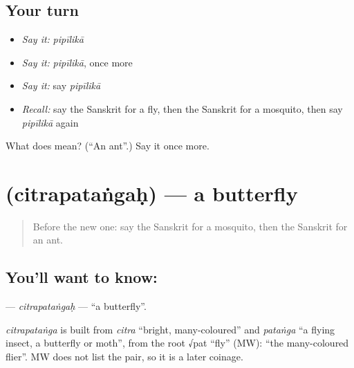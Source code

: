 \subsection*{Your turn}
\begin{itemize}
\raggedright
  \item \emph{Say it:} \emph{pipīlikā}
  \item \emph{Say it:} \emph{pipīlikā}, once more
  \item \emph{Say it:} say \emph{pipīlikā}
  \item \emph{Recall:} say the Sanskrit for a fly, then the Sanskrit for a mosquito, then say \emph{pipīlikā} again
\end{itemize}

\begin{tcolorbox}[breakable,colback=teal!4,colframe=teal!35!black,title={Before you move on}]
What does  mean? (\textquotedblleft{}An ant\textquotedblright{}.) Say it once more.
\end{tcolorbox}
\section[\texorpdfstring{\sk{चित्रपतंगः} (citrapataṅgaḥ)}{चित्रपतंगः (citrapataṅgaḥ)}]{ (citrapataṅgaḥ) — a butterfly}

\label{lesson:SA-C115-citrapatangah}



\begin{quote}
Before the new one: say the Sanskrit for a mosquito, then the Sanskrit for an ant.
\end{quote}

\subsection*{You'll want to know: }
\textbf{} — \emph{citrapataṅgaḥ} — \textquotedblleft{}a butterfly\textquotedblright{}.

\begin{cousinweb}
\emph{citrapataṅga} is built from \emph{citra} \textquotedblleft{}bright, many-coloured\textquotedblright{} and \emph{pataṅga} \textquotedblleft{}a flying insect, a butterfly or moth\textquotedblright{}, from the root √pat \textquotedblleft{}fly\textquotedblright{} (MW): \textquotedblleft{}the many-coloured flier\textquotedblright{}. MW does not list the pair, so it is a later coinage.
\end{cousinweb}

